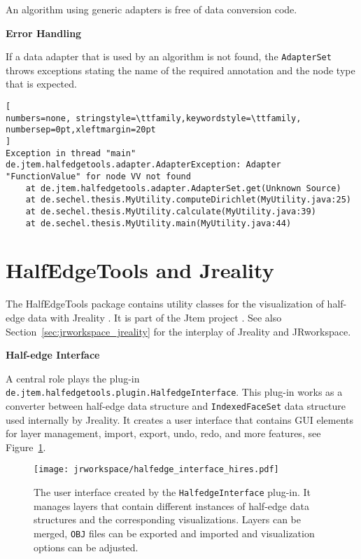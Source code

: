 \documentclass[Thesis.tex]{subfiles}
\begin{document}
An algorithm using generic adapters is free of data conversion code.


{\bf Error Handling}

If a data adapter that is used by an algorithm is not found, the {\tt AdapterSet} throws exceptions stating
the name of the required annotation and the node type that is expected. 

\begin{lstlisting}[
numbers=none, stringstyle=\ttfamily,keywordstyle=\ttfamily, numbersep=0pt,xleftmargin=20pt
]
Exception in thread "main" de.jtem.halfedgetools.adapter.AdapterException: Adapter "FunctionValue" for node VV not found
	at de.jtem.halfedgetools.adapter.AdapterSet.get(Unknown Source)
	at de.sechel.thesis.MyUtility.computeDirichlet(MyUtility.java:25)
	at de.sechel.thesis.MyUtility.calculate(MyUtility.java:39)
	at de.sechel.thesis.MyUtility.main(MyUtility.java:44)
\end{lstlisting}


\section{{\sc HalfEdgeTools} and {\sc Jreality}}
\label{sec:halfedge_tools_visualization}

The {\sc HalfEdgeTools} package contains utility classes for the visualization of half-edge data with 
{\sc Jreality} \cite{JrealityWebsite}. It is part of the {\sc Jtem} project \cite{JtemWebsite}. See also Section~\ref{sec:jrworkspace_jreality} for the interplay of {\sc Jreality} and {\sc JRworkspace}.

{\bf Half-edge Interface}

A central role plays the plug-in {\tt de.jtem.halfedge\-tools.plugin.Halfedge\-Interface}. This plug-in works 
as a converter between half-edge data structure and {\tt IndexedFaceSet} data structure used internally 
by {\sc Jreality}. It creates a user interface that contains GUI elements for layer management, import, export,
undo, redo, and more features, see Figure~\ref{fig:halfedge_interface}.

\begin{figure}
	\centering
	\texttt{[image: jrworkspace/halfedge\_interface\_hires.pdf]}
	\caption{The user interface created by the {\tt HalfedgeInterface} plug-in. It manages layers that
		contain different instances of half-edge data structures and the corresponding visualizations.
		Layers can be merged, {\tt OBJ} files can be exported and imported and visualization
		options can be adjusted. 
	}
	\label{fig:halfedge_interface}
\end{figure}
\end{document}
